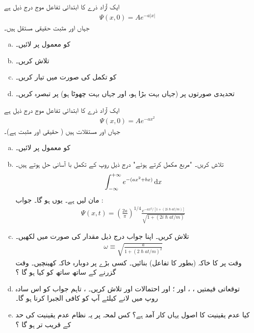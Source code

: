 ایک آزاد ذرے کا ابتدائی تفاعل موج درج ذیل ہے 
\begin{align*}
\Psi (x,0) = Ae^{ -a \left| x \right| } 
\end{align*}
جہاں  اور  مثبت حقیقی مستقل ہیں۔
\begin{enumerate}[a.]
\item 
{} کو معمول پر لائیں۔ 
\item
{} تلاش کریں۔ 
\item
{} کو تکمل کی صورت میں تیار کریں۔ 
\item
تحدیدی صورتوں پر (جہاں  بہت بڑا ہو، اور جہاں  بہت چھوٹا ہو) پر تبصرہ کریں۔ 
\end{enumerate}
 \quad {}
 ایک آزاد ذرے کا ابتدائی تفاعل موج درج ذیل ہے
\begin{align*}
\Psi(x,0) = A e^{-ax^{2}}
\end{align*}
جہاں  اور  مستقلات ہیں ( حقیقی اور مثبت ہے)۔ 
\begin{enumerate}[a.]
\item
{} کو معمول پر لائیں۔ 
\item
{} تلاش کریں۔  "مربع مکمل کرتے ہوئے" درج ذیل روپ کے تکمل با آسانی حل ہوتے ہیں۔ 
\begin{align*}
\int_{-\infty}^{+\infty} e^{-(ax^{2} +bx)} \dif x
\end{align*}
مان لیں  ہے۔ یوں  ہو گا۔ جواب : 
\begin{align*}
\Psi(x,t) = \left( \frac{2a}{\pi} \right) ^{1/4} \frac{e^{-ax^{2}/[1+(2i\hslash at/m)]}}{\sqrt{1+(2i\hslash at/m)}}
\end{align*}
\item
{} تلاش کریں۔ اپنا جواب درج ذیل مقدار کی صورت میں لکھیں۔ 
\begin{align*}
\omega \equiv \sqrt{\frac{a}{1+(2\hslash at/m)^{2}}}
\end{align*}
وقت  پر  کا خاکہ (بطور  کا تفاعل) بنائیں۔ کسی بڑے  پر دوبارہ خاکہ کھینچیں۔ وقت گزرنے کے ساتھ ساتھ  کو کیا ہو گا ؟
\item 
توقعاتی قیمتیں ، ،  اور ؛ اور احتمالات  اور  تلاش کریں۔
  ، تاہم جواب کو اس سادہ روپ میں لانے کیلئے آپ کو کافی الجبرا کرنا ہو گا۔ 
\item
کیا عدم یقینیت کا اصول یہاں کار آمد ہے؟ کس لمحہ  پر یہ نظام عدم یقینیت کی حد کے قریب تر ہو گا ؟
\end{enumerate}

